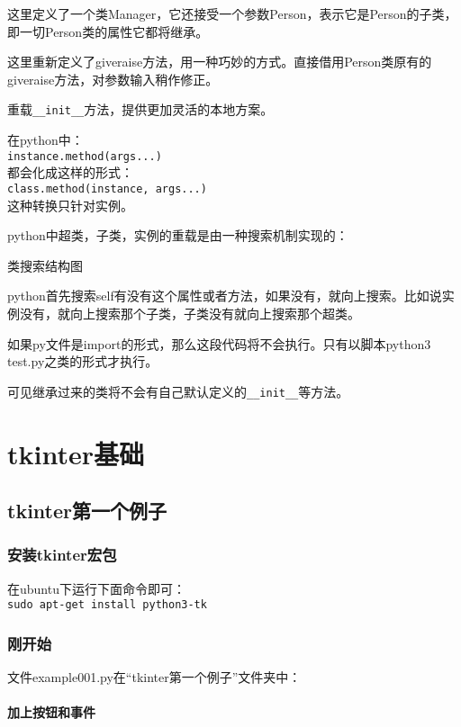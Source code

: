 \documentclass[12pt,oneside]{book}
\begin{document}
\begin{common-format}
这里定义了一个类Manager，它还接受一个参数Person，表示它是Person的子类，即一切Person类的属性它都将继承。

这里重新定义了giveraise方法，用一种巧妙的方式。直接借用Person类原有的giveraise方法，对参数输入稍作修正。

重载\verb+__init__+方法，提供更加灵活的本地方案。

在python中：\\
\verb+instance.method(args...)+\\
都会化成这样的形式：\\
\verb+class.method(instance, args...)+\\
这种转换只针对实例。

python中超类，子类，实例的重载是由一种搜索机制实现的：
\begin{fig}{类搜索结构图}
\label{fig:类搜索结构图}
\end{fig}
python首先搜索self有没有这个属性或者方法，如果没有，就向上搜索。比如说实例没有，就向上搜索那个子类，子类没有就向上搜索那个超类。


如果py文件是import的形式，那么这段代码将不会执行。只有以脚本python3 test.py之类的形式才执行。

可见继承过来的类将不会有自己默认定义的\verb+__init__+等方法。



\part{tkinter基础}
\chapter{tkinter第一个例子}
\section{安装tkinter宏包}
在ubuntu下运行下面命令即可：\\
\verb+sudo apt-get install python3-tk+

\section{刚开始}
文件example001.py在“tkinter第一个例子”文件夹中：



\subsection{加上按钮和事件}



\end{common-format}
\end{document}
